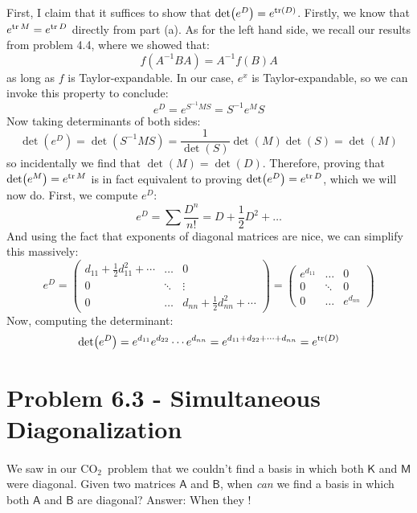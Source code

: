 \documentclass{article}
\def\OCO{$\textrm{CO}_{2}$}
\begin{document}
\begin{solution}
	First, I claim that it suffices to show that $\det(e^D) = e^{\operatorname{tr}(D)}$. Firstly, we know that $e^{\operatorname{tr} M} = 
	e^{\operatorname{tr} D}$ directly from part (a). As for the left hand side, we recall our results from problem 4.4, 
	where we showed that:
	\[
		f(A^{-1} B A)  = A^{-1} f(B) A
	\] 
	as long as $f$ is Taylor-expandable. In our case, $e^x$ is Taylor-expandable, so we can invoke this 
	property to conclude:
	\[
		e^{D} = e^{S^{-1}MS} = S^{-1} e^M S
	\] 
	Now taking determinants of both sides:
	\[
		\det(e^D) = \det(S^{-1}MS) = \frac{1}{\det(S)}\det(M) \det(S) = \det(M)
	\] 
	so incidentally we find that $\det(M) = \det(D)$. Therefore, proving that $\det(e^M) = e^{\operatorname{tr} M}$ is 
	in fact equivalent to proving $\det(e^D) = e^{\operatorname{tr} D}$, which we will now do. 
	First, we compute $e^D$:
    \[
        e^D = \sum \frac{D^n}{n!} = D + \frac 12 D^2 + \dots
    \]
    And using the fact that exponents of diagonal matrices are nice, we can simplify this massively:
    \[ 
        e^D = \begin{pmatrix} d_{11} + \frac 12 d_{11}^2 + \cdots & \dots & 0\\
        0 & \ddots & \vdots \\
        0 &\dots & d_{nn} + \frac 12 d_{nn}^2 + \cdots \end{pmatrix} = \begin{pmatrix} e^{d_{11}} & \dots & 0\\
        0 & \ddots & 0\\
        0  & \dots & e^{d_{nn}}\end{pmatrix}
        \]
    Now, computing the determinant:
    \[ 
        \det(e^D) = e^{d_{11}} e^{d_{22}} \cdots e^{d_{nn}} = e^{d_{11} + d_{22} + \cdots + d_{nn}} = e^{\operatorname{tr}(D)}
        \]
\end{solution}


\bigskip
\dphline
\pagebreak
\section*{Problem 6.3 - Simultaneous Diagonalization}

\paragraph{}
We saw in our \OCO\ problem that we couldn't find a basis in which both $\mathsf{K}$ and $\mathsf{M}$ were diagonal.  
Given two matrices $\mathsf{A}$ and $\mathsf{B}$, when \emph{can} we find a basis in which both $\mathsf{A}$ and $\mathsf{B}$ are diagonal?  
Answer:  When they !
\end{document}

